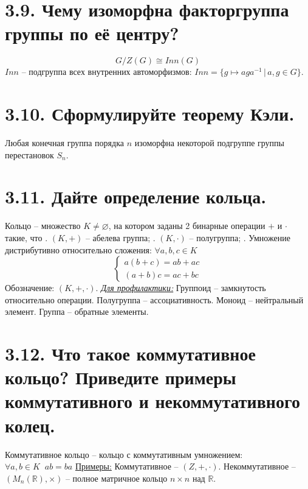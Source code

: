 \documentclass{article}
\begin{document}
\section*{\LARGE 3.9. Чему изоморфна факторгруппа группы по её центру? }
$$G/Z(G) \cong Inn(G)$$
$Inn$ -- подгруппа всех внутренних автоморфизмов: $Inn = \{g \mapsto aga^{-1}\,|\, a,g \in G\}$.

\section*{\LARGE 3.10. Сформулируйте теорему Кэли. }
Любая конечная группа порядка $n$ изоморфна некоторой подгруппе группы перестановок $S_n$.

\section*{\LARGE 3.11. Дайте определение кольца. }
Кольцо -- множество $K \ne \varnothing$, на котором заданы 2 бинарные операции $+$ и $\cdot$ такие, что
\newline{}. $(K, +)$ -- абелева группа;
\newline{}. $(K, \cdot)$ -- полугруппа;
\newline{}. Умножение дистрибутивно относительно сложения: $\forall a,b,c \in K$
$$
\begin{cases}
a(b + c) = ab + ac \\
(a + b)c = ac + bc 
\end{cases}
$$
Обозначение: $(K, +, \cdot)$.
\newline \underline{\textit{Для профилактики:}}
\newline Группоид -- замкнутость относительно операции.
\newline Полугруппа -- ассоциативность.
\newline Моноид -- нейтральный элемент.
\newline Группа -- обратные элементы.

\section*{\LARGE 3.12. Что такое коммутативное кольцо? Приведите примеры коммутативного и некоммутативного колец. }
Коммутативное кольцо -- кольцо с коммутативным умножением: $\forall a,b \in K \;\; ab = ba$
\newline \underline{Примеры:}
\newline Коммутативное -- $(Z, +, \cdot)$.
\newline Некоммутативное -- $(M_n(\mathbb{R}), \times)$ -- полное матричное кольцо $n\times n$ над $\mathbb{R}$.
\end{document}
